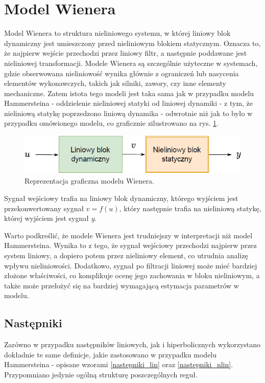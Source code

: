 \section{Model Wienera}
Model Wienera to struktura nieliniowego systemu, w której liniowy blok dynamiczny jest umieszczony przed nieliniowym blokiem statycznym. Oznacza to, że najpierw wejście przechodzi przez liniowy filtr, a następnie poddawane jest nieliniowej transformacji. Modele Wienera są szczególnie użyteczne w systemach, gdzie obserwowana nieliniowość wynika głównie z ograniczeń lub nasycenia elementów wykonawczych, takich jak silniki, zawory, czy inne elementy mechaniczne.  Zatem istota tego modeli jest taka sama jak w przypadku modelu Hammersteina - oddzielenie nieliniowej statyki od liniowej dynamiki - z tym, że nieliniową statykę poprzedzono liniową dynamika - odwrotnie niż jak to było w przypadku omówionego modelu, co graficznie zilustrowano na rys. \ref{wien_model}.

\begin{figure}[h!]
\centering
\includegraphics[width=\textwidth]{pictures/wien_model}
\caption{Reprezentacja graficzna modelu Wienera.}
\label{wien_model}
\end{figure}

Sygnał wejściowy trafia na liniowy blok dynamiczny, którego wyjściem jest przekonwertowany sygnał $v = f(u)$, który następnie trafia na nieliniową statykę, której wyjściem jest sygnał $y$.

Warto podkreślić, że modele Wienera jest trudniejszy w interpretacji niż model Hammersteina. Wynika to z tego, że sygnał wejściowy przechodzi najpierw przez system liniowy, a dopiero potem przez nieliniowy element, co utrudnia analizę wpływu nieliniowości. Dodatkowo, sygnał po filtracji liniowej może mieć bardziej złożone właściwości, co komplikuje ocenę jego zachowania w bloku nieliniowym, a także może przełożyć się na bardziej wymagającą estymacja parametrów w modelu.

\subsection{Następniki}
Zarówno w przypadku następników liniowych, jak i hiperbolicznych wykorzystano dokładnie te same definicje, jakie zastosowano w przypadku modelu Hammersteina - opisane wzorami \ref{nastepniki_lin} oraz \ref{nastepniki_nlin}. Przypomniano jedynie ogólną strukturę poszczególnych reguł.


